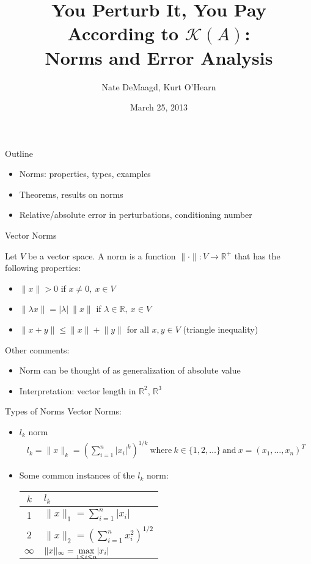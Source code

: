 \documentclass[9pt, serif]{beamer}
\title[Norms and Error Analysis]
{You Perturb It, You Pay According to $\mathcal{K}(A)$:\\Norms and Error Analysis}
\author[]
{Nate DeMaagd, Kurt O'Hearn}
\institute[Grand Valley State University]
{MTH 499-02}
\date{March 25, 2013}
\newlength{\wideitemsep}
\let\olditem\item
\renewcommand{\item}{\setlength{\itemsep}{\wideitemsep}\olditem}
\newcommand{\bi}{\begin{itemize}}
\newcommand{\ei}{\end{itemize}}
\newcommand{\abs}[1]{\lvert#1\rvert}
\newcommand{\norm}[1]{\lVert#1\rVert}
\begin{document}
\begin{frame}
    \titlepage
\end{frame}

\begin{frame}{Outline}
    \bi
        \item Norms: properties, types, examples \pause
        \item Theorems, results on norms \pause
        \item Relative/absolute error in perturbations, conditioning number
    \ei
\end{frame}


\begin{frame}{Vector Norms}
    \pause
    \begin{definition}
        Let $V$ be a vector space.  A norm is a function $\norm{\cdot}: V \to \mathbb{R}^+$ that
        has the following properties:
        \bi
            \item $\norm{x}>0$ if $x\neq0,~x\in V$
            \item $\norm{\lambda x} = \abs{\lambda}~\norm{x}$ if $\lambda\in\mathbb{R},~x\in V$
            \item $\norm{x+y}\leq\norm{x} + \norm{y}$ for all $x,y \in V$ (triangle inequality)
        \ei
    \end{definition} \pause
    Other comments:
\bi
    \item Norm can be thought of as generalization of absolute value
    \item Interpretation: vector length in $\mathbb{R}^2$, $\mathbb{R}^3$
\ei
\end{frame}


\begin{frame}{Types of Norms}
    \pause
    Vector Norms:
    \pause
    \bi
    \item $l_k$ norm
        \begin{align*}
            l_k = \norm{x}_k = \left(\sum\limits_{i=1}^n \abs{x_i}^k\right)^{1/k}~\text{where}~k\in\{1,2,\dots\}~\text{and}~x=(x_1,\dots,x_n)^T
        \end{align*}
    \pause

\item Some common instances of the $l_k$ norm:
\begin{table}[H]
        \centering
    \begin{tabular}{c | l}

     $k$ & $l_k$ \\
     \hline
     1 & $\norm{x}_1 = \sum\limits_{i=1}^n \abs{x_i}$ \\
     2 & $\norm{x}_2=\left(\sum\limits_{i=1}^n x_i^2\right)^{1/2}$ \\
    $\infty$ & $\norm{x}_\infty = \smash{\displaystyle\max_{1 \leq i \leq n}} \abs{x_i}$
    \end{tabular}
    \end{table}

\ei
\end{frame}
\end{document}
